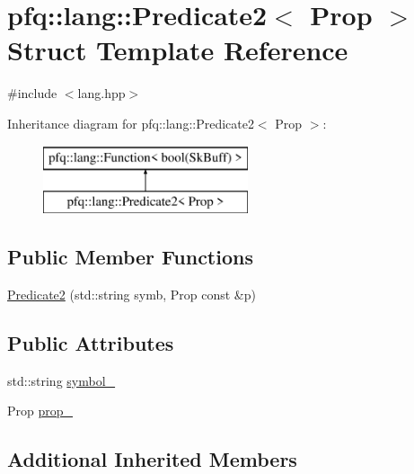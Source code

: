 \hypertarget{structpfq_1_1lang_1_1Predicate2}{\section{pfq\+:\+:lang\+:\+:Predicate2$<$ Prop $>$ Struct Template Reference}
\label{structpfq_1_1lang_1_1Predicate2}
}


{\ttfamily \#include $<$lang.\+hpp$>$}

Inheritance diagram for pfq\+:\+:lang\+:\+:Predicate2$<$ Prop $>$\+:\begin{figure}[H]
\begin{center}
\leavevmode
\includegraphics[height=2.000000cm]{structpfq_1_1lang_1_1Predicate2}
\end{center}
\end{figure}
\subsection*{Public Member Functions}
\begin{DoxyCompactItemize}
\item 
\hyperlink{structpfq_1_1lang_1_1Predicate2_ab1844d59cc941272df9da579db42da47}{Predicate2} (std\+::string symb, Prop const \&p)
\end{DoxyCompactItemize}
\subsection*{Public Attributes}
\begin{DoxyCompactItemize}
\item 
std\+::string \hyperlink{structpfq_1_1lang_1_1Predicate2_aadc8936cb2a999d80c59ca3a7ec6e70f}{symbol\+\_\+}
\item 
Prop \hyperlink{structpfq_1_1lang_1_1Predicate2_ac211787bd97d9956fbb1dad896ff5c48}{prop\+\_\+}
\end{DoxyCompactItemize}
\subsection*{Additional Inherited Members}


